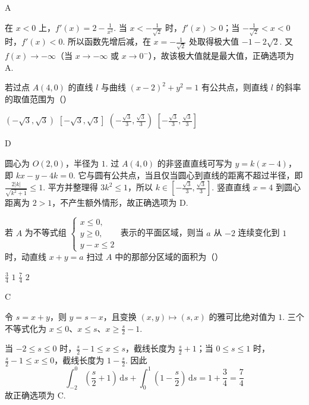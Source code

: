 \begin{answer}
A
\end{answer}

\begin{solution}
在 \(x<0\) 上，\(f'(x)=2-\frac1{x^2}\). 当 \(x<-\frac{1}{\sqrt2}\) 时，\(f'(x)>0\)；当 \(-\frac{1}{\sqrt2}<x<0\) 时，\(f'(x)<0\). 所以函数先增后减，在 \(x=-\frac{1}{\sqrt2}\) 处取得极大值 \(-1-2\sqrt2\). 又 \(f(x)\to-\infty\)（当 \(x\to-\infty\) 或 \(x\to0^-\)），故该极大值就是最大值，正确选项为 A.
\end{solution}

\begin{problem}
若过点 \(A(4,0)\) 的直线 \(l\) 与曲线 \((x - 2)^2 + y^2 = 1\) 有公共点，则直线 \(l\) 的斜率的取值范围为（\quad）

\choices
    {\((- \sqrt{3}, \sqrt{3})\)}
    {\([- \sqrt{3}, \sqrt{3}]\)}
    {\(\left(-\frac{\sqrt{3}}{3}, \frac{\sqrt{3}}{3}\right)\)}
    {\(\left[-\frac{\sqrt{3}}{3}, \frac{\sqrt{3}}{3}\right]\)}
\end{problem}

\begin{answer}
D
\end{answer}

\begin{solution}
圆心为 \(O(2,0)\)，半径为 \(1\). 过 \(A(4,0)\) 的非竖直直线可写为 \(y=k(x-4)\)，即 \(kx-y-4k=0\). 它与圆有公共点，当且仅当圆心到直线的距离不超过半径，即 \(\frac{2|k|}{\sqrt{k^2+1}}\leqslant1\). 平方并整理得 \(3k^2\leqslant1\)，所以 \(k\in[-\frac{\sqrt3}{3},\frac{\sqrt3}{3}]\). 竖直直线 \(x=4\) 到圆心距离为 \(2>1\)，不产生额外情形，故正确选项为 D.
\end{solution}

\begin{problem}
若 \(A\) 为不等式组 \(\begin{cases}
x \leqslant 0,\\
y \geqslant 0,\\
y - x \leqslant 2
\end{cases}\) 表示的平面区域，则当 \(a\) 从 \(-2\) 连续变化到 \(1\) 时，动直线 \(x + y = a\) 扫过 \(A\) 中的那部分区域的面积为（\quad）

\choices
    {\(\frac{3}{4}\)}
    {\(1\)}
    {\(\frac{7}{4}\)}
    {\(2\)}
\end{problem}

\begin{answer}
C
\end{answer}

\begin{solution}
令 \(s=x+y\)，则 \(y=s-x\)，且变换 \((x,y)\mapsto(s,x)\) 的雅可比绝对值为 \(1\). 三个不等式化为 \(x\leqslant0\)、\(x\leqslant s\)、\(x\geqslant \frac{s}{2}-1\).

当 \(-2\leqslant s\leqslant0\) 时，\(\frac{s}{2}-1\leqslant x\leqslant s\)，截线长度为 \(\frac{s}{2}+1\)；当 \(0\leqslant s\leqslant1\) 时，\(\frac{s}{2}-1\leqslant x\leqslant0\)，截线长度为 \(1-\frac{s}{2}\). 因此
\[
\int_{-2}^{0}\left(\frac{s}{2}+1\right)\,\mathrm ds+\int_{0}^{1}\left(1-\frac{s}{2}\right)\,\mathrm ds=1+\frac34=\frac74
\]
故正确选项为 C.
\end{solution}

